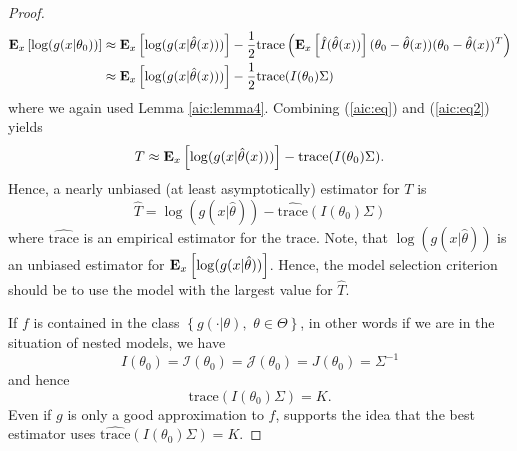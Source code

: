 \documentclass[a4paper, 11pt]{scrreprt}
\newcommand{\trace}{{\mathrm{trace}}}
\newcommand{\ew}{\mbox{\textbf{E}}}
\begin{document}
\begin{proof}
\begin{align}
\ew_x\left[ \log(g(x|\theta_0)) \right] 
&\approx \ew_x\left[ \log(g(x|\hat{\theta}(x))) \right]
- \frac{1}{2} \trace \left( \ew_x \left[ \hat{I}(\hat{\theta}(x)) \right] (\theta_0 - \hat{\theta}(x)) (\theta_0 - \hat{\theta}(x))^T \right) \nonumber \\
&\approx \ew_x\left[ \log(g(x|\hat{\theta}(x))) \right] - \frac{1}{2} \trace(I(\theta_0) \Sigma)
\label{aic:eq2}
\end{align}
where we again used Lemma \ref{aic:lemma4}.
Combining (\ref{aic:eq}) and (\ref{aic:eq2}) yields
\[
T \approx \ew_x \left[ \log(g(x|\hat{\theta}(x))) \right] - \trace(I(\theta_0) \Sigma).
\]
Hence, a nearly unbiased (at least asymptotically) estimator for $T$ is
\begin{equation}\label{aic:That}
\hat{T} = \log(g(x|\hat{\theta})) - \widehat{\trace}(I(\theta_0) \Sigma)
\end{equation}
where $\widehat{\trace}$ is an empirical estimator for the $\trace$. Note, that $\log(g(x|\hat{\theta}))$ is an unbiased estimator for $\ew_x \left[\log(g(x|\hat{\theta})) \right]$. 
Hence, the model selection criterion should be to use the model with the largest value for $\hat{T}$.

If $f$ is contained in the class $\left\{ g(\cdot|\theta), \,\, \theta\in\Theta \right\}$, in other words if we are in the situation of nested models, we have
\[ 
I(\theta_0) = \mathcal{I}(\theta_0) = \mathcal{J}(\theta_0) = J(\theta_0) = \Sigma^{-1}
\]
and hence
\[
\trace(I(\theta_0)\Sigma) = K.
\]
Even if $g$ is only a good approximation to $f$, \textcite[p. 5]{shibata1989statistical} supports the idea that the best estimator uses $\widehat{\trace}(I(\theta_0) \Sigma) = K$.


\end{proof}
\end{document}
